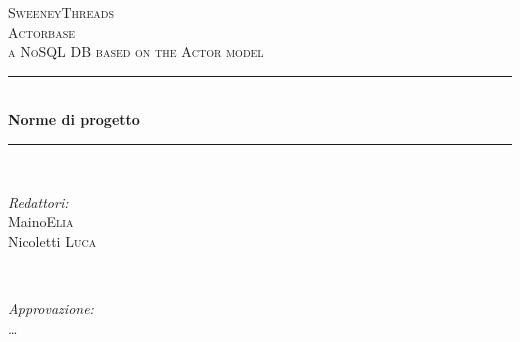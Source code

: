 \documentclass[a4paper]{report}
\begin{document}
	
	\begin{titlepage}
		\newcommand{\HRule}{\rule{\linewidth}{0.5mm}} 
		\center  
		
		\textsc{\LARGE SweeneyThreads}\\[1.5cm] 
		\textsc{\Large Actorbase}\\[0.5cm] 
		\textsc{\large a NoSQL DB based on the Actor model}\\[0.5cm]
		
		
		\HRule \\[0.4cm]
		{ \huge \bfseries Norme di progetto}\\[0.4cm] 
		\HRule \\[1.5cm]
		
		\begin{minipage}{0.4\textwidth}
			\begin{flushleft} \large
				\emph{Redattori:}\\
				Maino\textsc{Elia} \\
				Nicoletti \textsc{Luca} \\
			\end{flushleft}
		\end{minipage}
		~
		\begin{minipage}{0.4\textwidth}
			\begin{flushright} \large
				\emph{Approvazione:} \\
				\dots
			\end{flushright}
		\end{minipage}
		

\end{titlepage}
\end{document}
